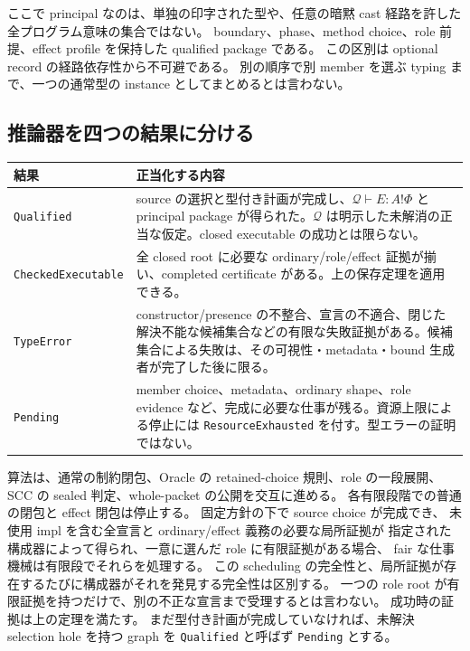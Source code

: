 \documentclass[11pt,a4paper]{article}
\theoremstyle{remark}
\begin{document}
ここで principal なのは、単独の印字された型や、任意の暗黙 cast 経路を許した全プログラム意味の集合ではない。
boundary、phase、method choice、role 前提、effect profile を保持した qualified package である。
この区別は optional record の経路依存性から不可避である。
別の順序で別 member を選ぶ typing まで、一つの通常型の instance としてまとめるとは言わない。

\subsection{推論器を四つの結果に分ける}

\begin{longtable}{p{}p{}}
\toprule
結果 & 正当化する内容 \\
\midrule\endhead
\texttt{Qualified} & source の選択と型付き計画が完成し、\(\mathcal Q\vdash E:A!\Phi\) と principal package が得られた。\(\mathcal Q\) は明示した未解消の正当な仮定。closed executable の成功とは限らない。\\
\texttt{CheckedExecutable} & 全 closed root に必要な ordinary/role/effect 証拠が揃い、completed certificate がある。上の保存定理を適用できる。\\
\texttt{TypeError} & constructor/presence の不整合、宣言の不適合、閉じた解決不能な候補集合などの有限な失敗証拠がある。候補集合による失敗は、その可視性・metadata・bound 生成者が完了した後に限る。\\
\texttt{Pending} & member choice、metadata、ordinary shape、role evidence など、完成に必要な仕事が残る。資源上限による停止には \texttt{ResourceExhausted} を付す。型エラーの証明ではない。\\
\bottomrule
\end{longtable}

算法は、通常の制約閉包、Oracle の retained-choice 規則、role の一段展開、
SCC の sealed 判定、whole-packet の公開を交互に進める。
各有限段階での普通の閉包と effect 閉包は停止する。
固定方針の下で source choice が完成でき、
未使用 impl を含む全宣言と ordinary/effect 義務の必要な局所証拠が
指定された構成器によって得られ、一意に選んだ role に有限証拠がある場合、
fair な仕事機械は有限段でそれらを処理する。
この scheduling の完全性と、局所証拠が存在するたびに構成器がそれを発見する完全性は区別する。
一つの role root が有限証拠を持つだけで、別の不正な宣言まで受理するとは言わない。
成功時の証拠は上の定理を満たす。
まだ型付き計画が完成していなければ、未解決 selection hole を持つ graph を
\texttt{Qualified} と呼ばず \texttt{Pending} とする。
\end{document}
